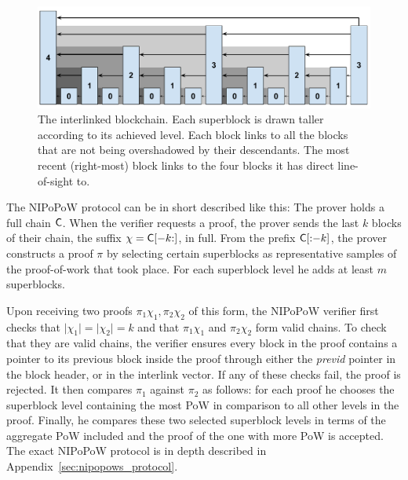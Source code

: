 \begin{figure}[ht]
    \centering
    \includegraphics[width=0.8\columnwidth,keepaspectratio]{figures/level-shadows.pdf}
    \caption{The interlinked blockchain. Each superblock is drawn taller
    according to its achieved level. Each block links to all the blocks that are
    not being overshadowed by their descendants. The most recent (right-most)
    block links to the four blocks it has direct line-of-sight to.}
    \label{fig.hierarchy}
\end{figure}

The NIPoPoW protocol can be in short described like this: The prover holds a full chain
$\mathsf{C}$. When the verifier requests a proof, the prover sends the last $k$
blocks of their chain, the suffix $\chi = \mathsf{C}[-k{:}]$, in full. From the
prefix $\mathsf{C}[{:}{-k}]$, the prover constructs a proof $\pi$ by selecting
certain superblocks as representative samples of the proof-of-work that took
place. For each superblock level he adds at least $m$ superblocks.

Upon receiving two proofs $\pi_1\chi_1, \pi_2\chi_2$ of this form, the NIPoPoW verifier
first checks that $\lvert \chi_1 \rvert = \lvert \chi_2 \rvert = k$ and that
$\pi_1 \chi_1$ and $\pi_2 \chi_2$ form valid chains. To check that they are
valid chains, the verifier ensures every block in the
proof contains a pointer to its previous block inside the proof through either
the \emph{previd} pointer in the block header, or in the interlink vector. If
any of these checks fail, the proof is rejected. It then
compares $\pi_1$ against $\pi_2$ as follows: for each proof he chooses the superblock level containing the most PoW in comparison to all other levels in the proof. Finally, he compares these two selected superblock levels in terms of the aggregate PoW included and the proof of the one with more PoW is accepted. The exact NIPoPoW protocol is in depth described in Appendix~\ref{sec:nipopows_protocol}.

